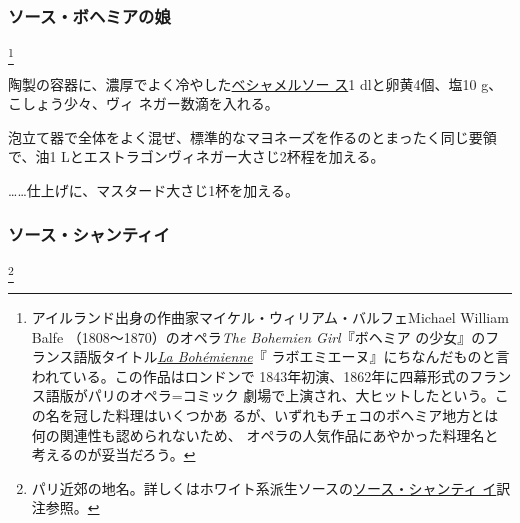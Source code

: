\begin{recette}
\maeaki

\hypertarget{sauce-bohemienne}{%
\subsubsection{ソース・ボヘミアの娘}\label{sauce-bohemienne}}

\footnote{アイルランド出身の作曲家マイケル・ウィリアム・バルフェMichael
  William Balfe （1808〜1870）のオペラ\emph{The Bohemien Girl}『ボヘミア
  の少女』のフランス語版タイトル\href{https://archive.org/details/labohmiennegrand00balf}{\emph{La
  Bohémienne}}『
  ラボエミエーヌ』にちなんだものと言われている。この作品はロンドンで
  1843年初演、1862年に四幕形式のフランス語版がパリのオペラ=コミック
  劇場で上演され、大ヒットしたという。この名を冠した料理はいくつかあ
  るが、いずれもチェコのボヘミア地方とは何の関連性も認められないため、
  オペラの人気作品にあやかった料理名と考えるのが妥当だろう。}


陶製の容器に、濃厚でよく冷やした\protect\hyperlink{sauce-bechamel}{ベシャメルソー
ス}1\undemi{} dlと卵黄4個、塩10 g、こしょう少々、ヴィ
ネガー数滴を入れる。

泡立て器で全体をよく混ぜ、標準的なマヨネーズを作るのとまったく同じ要領
で、油1 Lとエストラゴンヴィネガー大さじ2杯程を加える。

\ldots{}\ldots{}仕上げに、マスタード大さじ1杯を加える。

\maeaki

\hypertarget{sauce-chantilly-froide}{%
\subsubsection{ソース・シャンティイ}\label{sauce-chantilly-froide}}

\footnote{パリ近郊の地名。詳しくはホワイト系派生ソースの\protect\hyperlink{sauce-chantilly}{ソース・シャンティ
  イ}訳注参照。}



\end{recette}
